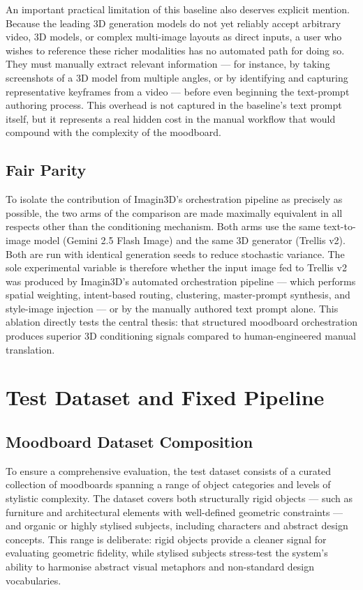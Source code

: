 An important practical limitation of this baseline also deserves explicit mention. Because the leading 3D generation models do not yet reliably accept arbitrary video, 3D models, or complex multi-image layouts as direct inputs, a user who wishes to reference these richer modalities has no automated path for doing so. They must manually extract relevant information --- for instance, by taking screenshots of a 3D model from multiple angles, or by identifying and capturing representative keyframes from a video --- before even beginning the text-prompt authoring process. This overhead is not captured in the baseline's text prompt itself, but it represents a real hidden cost in the manual workflow that would compound with the complexity of the moodboard.

\subsection{Fair Parity}

To isolate the contribution of Imagin3D's orchestration pipeline as precisely as possible, the two arms of the comparison are made maximally equivalent in all respects other than the conditioning mechanism. Both arms use the same text-to-image model (Gemini 2.5 Flash Image) and the same 3D generator (Trellis v2). Both are run with identical generation seeds to reduce stochastic variance. The sole experimental variable is therefore whether the input image fed to Trellis v2 was produced by Imagin3D's automated orchestration pipeline --- which performs spatial weighting, intent-based routing, clustering, master-prompt synthesis, and style-image injection --- or by the manually authored text prompt alone. This ablation directly tests the central thesis: that structured moodboard orchestration produces superior 3D conditioning signals compared to human-engineered manual translation.

\section{Test Dataset and Fixed Pipeline}

\subsection{Moodboard Dataset Composition}

To ensure a comprehensive evaluation, the test dataset consists of a curated collection of moodboards spanning a range of object categories and levels of stylistic complexity. The dataset covers both structurally rigid objects --- such as furniture and architectural elements with well-defined geometric constraints --- and organic or highly stylised subjects, including characters and abstract design concepts. This range is deliberate: rigid objects provide a cleaner signal for evaluating geometric fidelity, while stylised subjects stress-test the system's ability to harmonise abstract visual metaphors and non-standard design vocabularies.

